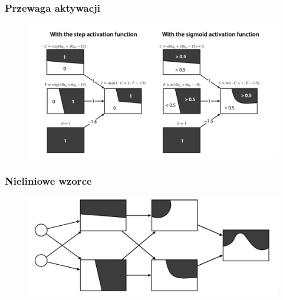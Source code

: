 \documentclass[smaller]{beamer}
\begin{document}

\begin{frame}
\frametitle{Przewaga aktywacji}
\begin{figure}
    \centering
    \includegraphics[width=\textwidth,height=0.7\textheight,keepaspectratio]{../manifest/step-non-linear.png}
\end{figure}
\end{frame}


\begin{frame}
\frametitle{Nieliniowe wzorce}
\begin{figure}
    \centering
    \includegraphics[width=\textwidth,height=0.7\textheight,keepaspectratio]{../manifest/non-linear.png}
\end{figure}
\end{frame}

\end{document}

